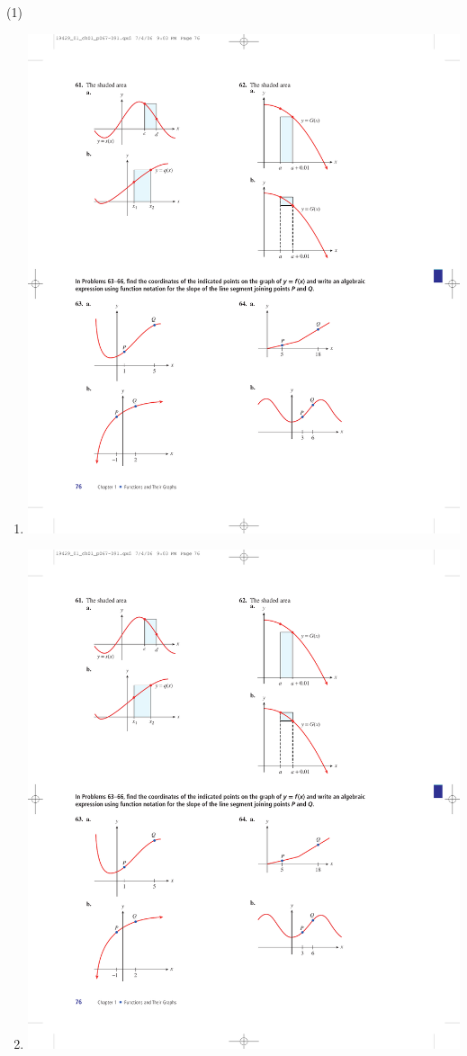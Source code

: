 \documentclass[10pt,]{book}
\theoremstyle{plain}
\theoremstyle{definition}
\theoremstyle{definition}
\theoremstyle{definition}
\theoremstyle{definition}
\numberwithin{equation}{part}
\begin{document}
\begin{exercisegroup}(1)
\exercise[63.]\hypertarget{exercise-278}{}\leavevmode%
\begin{multicols}{2}
\begin{enumerate}[label=*\alph**]
\item\hypertarget{li-1090}{}\includegraphics[width=0.8\linewidth]{images/fig-ex-1-4-63a}
%
\item\hypertarget{li-1091}{}\includegraphics[width=0.8\linewidth]{images/fig-ex-1-4-63b}

\end{enumerate}
\end{multicols}
\end{exercisegroup}
\end{document}
